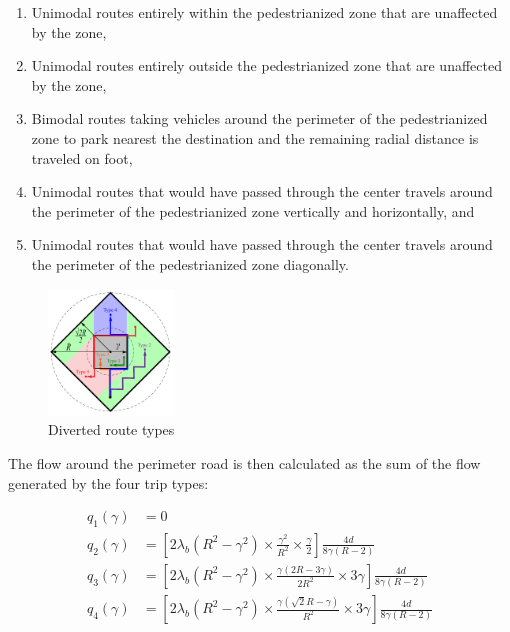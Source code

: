 \documentclass{article}
\begin{document}
\begin{enumerate}
	\item Unimodal routes entirely within the pedestrianized zone that are unaffected by the zone, 
	\item Unimodal routes entirely outside the pedestrianized zone that are unaffected by the zone,
	\item Bimodal routes taking vehicles around the perimeter of the pedestrianized zone to park nearest the destination and the remaining radial distance is traveled on foot,
	\item Unimodal routes that would have passed through the center travels around the perimeter of the pedestrianized zone vertically and horizontally, and
	\item Unimodal routes that would have passed through the center travels around the perimeter of the pedestrianized zone diagonally.
\end{enumerate}

\begin{figure}[!ht]
     \centering
     \includegraphics[width=0.3\textwidth]{diagram_diverted_routes}
     \caption{Diverted route types}
     \label{fig:diverted}
\end{figure}


The flow around the perimeter road is then calculated as the sum of the flow generated by the four trip types:

\begin{subequations}
\begin{align}
	q_1(\gamma) &= 0 \\
	q_2(\gamma) &= \left[2 \lambda_b \left(R^2 - \gamma^2\right) \times \frac{\gamma^2}{R^2} \times\frac{\gamma}{2}\right] \frac{4d}{8\gamma (R-2)}\\
	q_3(\gamma) &= \left[2 \lambda_b \left(R^2 - \gamma^2\right) \times \frac{\gamma (2R - 3\gamma)}{2R^2} \times  3\gamma\right] \frac{4d}{8\gamma (R-2)}\\
	q_4(\gamma) &= \left[2 \lambda_b \left(R^2 - \gamma^2\right) \times \frac{\gamma (\sqrt{2}R-\gamma)}{R^2} \times  3\gamma\right] \frac{4d}{8\gamma (R-2)}\\
\end{align}
\end{subequations}
\end{document}
